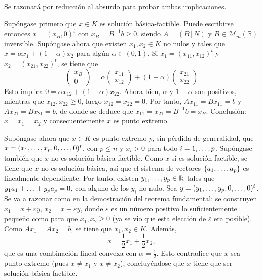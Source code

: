 \documentclass[11pt]{report}
\makeatletter
\renewenvironment{proof}[1][\proofname]{\par
  \pushQED{\qed}%
  \normalfont \topsep\z@skip %
  \trivlist
  \item[\hskip\labelsep
        \itshape
    #1\@addpunct{.}]\ignorespaces
}{%
  \popQED\endtrivlist\@endpefalse
}
\theoremstyle{mytheorem}
\theoremstyle{mydefinition}
\theoremstyle{myexample}
\let\oldproofname=\proofname
\renewcommand{\proofname}{\rm\bf{\oldproofname}}}
\newcommand{\R}{\mathbb R}
\makeatother
\begin{document}
\begin{proof}
Se razonará por reducción al absurdo para probar ambas implicaciones.


Supóngase primero que $x \in K$ es solución básica-factible. Puede escribirse entonces $x = (x_B,0)^t$ con $x_B = B^{-1}b \geq 0$, siendo $A = (B \, | \, N)$ y $B \in \mathcal{M}_m(\R)$ inversible. Supóngase ahora que existen $x_1,x_2 \in K$ no nulos y tales que $x = \alpha x_1+(1-\alpha)x_2$ para algún $\alpha \in (0,1)$. Si $x_1=(x_{11},x_{12})^t$ y $x_2 = (x_{21},x_{22})^t$, se tiene que
\[\begin{pmatrix}
    x_B \\
    0
\end{pmatrix} = \alpha \begin{pmatrix}
    x_{11} \\
    x_{12}
\end{pmatrix}+(1-\alpha)\begin{pmatrix}
    x_{21} \\
    x_{22}
\end{pmatrix}\]
Esto implica $0 = \alpha x_{12}+(1-\alpha)x_{22}$. Ahora bien, $\alpha$ y $1-\alpha$ son positivos, mientras que $x_{12},x_{22} \geq 0$, luego $x_{12} = x_{22} = 0$. Por tanto, $Ax_{11} = Bx_{11} = b$ y $Ax_{21} = Bx_{21} = b$, de donde se deduce que $x_{11} = x_{21} = B^{-1}b = x_B$. Conclusión: $x = x_1 = x_2$ y consecuentemente $x$ es punto extremo.



Supóngase ahora que $x \in K$ es punto extremo y, sin pérdida de generalidad, que $x = (x_1,\mathellipsis,x_p,0,\mathellipsis,0)^t$, con $p \leq n$ y $x_i >0$ para todo $i = 1,\mathellipsis,p$. Supóngase también que $x$ no es solución básica-factible. Como $x$ sí es solución factible, se tiene que $x$ no es solución básica, así que el sistema de vectores $\{a_1,\mathellipsis,a_p\}$ es linealmente dependiente. Por tanto, existen $y_1,\mathellipsis,y_p \in \R$ tales que $y_1a_1+\mathellipsis+y_pa_p = 0$, con alguno de los $y_i$ no nulo. Sea $y = (y_1,\mathellipsis,y_p,0,\mathellipsis,0)^t$. Se va a razonar como en la demostración del teorema fundamental: se construyen $x_1 = x+\varepsilon y$, $x_2 = x-\varepsilon y$, donde $\varepsilon$ es un número positivo lo suficientemente pequeño como para que $x_1,x_2 \geq 0$ (ya se vio que esta elección de $\varepsilon$ era posible). Como $Ax_1 = Ax_2 = b$, se tiene que $x_1,x_2 \in K$. Además,
\[x = \frac{1}{2} x_1+\frac{1}{2}x_2,\]
que es una combinación lineal convexa con $\alpha = \frac{1}{2}$. Esto contradice que $x$ sea punto extremo (pues $x \neq x_1$ y $x \neq x_2$), concluyéndose que $x$ tiene que ser solución básica-factible.
\end{proof}
\end{document}
